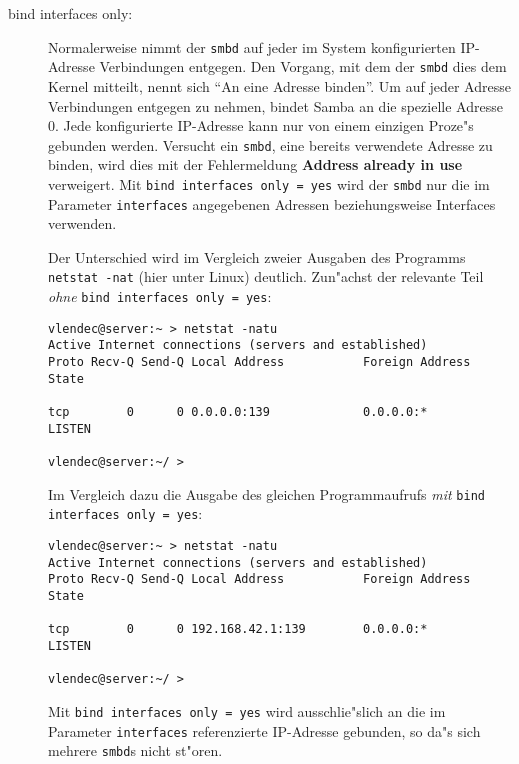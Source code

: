 \documentclass{scrartcl}\usepackage{pslatex}\typearea{12}
\newcommand{\prog}{\texttt}
\newcommand{\param}{\texttt}
\begin{document}
\begin{description}
\item[bind interfaces only:] Normalerweise nimmt der \prog{smbd} auf
  jeder im System konfigurierten IP-Adresse Verbindungen entgegen. Den
  Vorgang, mit dem der \prog{smbd} dies dem Kernel mitteilt, nennt
  sich "`An eine Adresse binden"'. Um auf jeder Adresse Verbindungen
  entgegen zu nehmen, bindet Samba an die spezielle Adresse 0. Jede
  konfigurierte IP-Adresse kann nur von einem einzigen Proze"s
  gebunden werden. Versucht ein \prog{smbd}, eine bereits verwendete
  Adresse zu binden, wird dies mit der Fehlermeldung \textbf{Address
    already in use} verweigert. Mit \prog{bind interfaces only = yes}
  wird der \prog{smbd} nur die im Parameter \prog{interfaces}
  angegebenen Adressen beziehungsweise Interfaces verwenden.
  
  Der Unterschied wird im Vergleich zweier Ausgaben des Programms
  \prog{netstat -nat} (hier unter Linux) deutlich. Zun"achst der
  relevante Teil \emph{ohne} \param{bind interfaces only = yes}:

\begin{verbatim}
vlendec@server:~ > netstat -natu
Active Internet connections (servers and established)
Proto Recv-Q Send-Q Local Address           Foreign Address         State    
 
tcp        0      0 0.0.0.0:139             0.0.0.0:*               LISTEN   
  
vlendec@server:~/ > 
\end{verbatim}
  
  Im Vergleich dazu die Ausgabe des gleichen Programmaufrufs
  \emph{mit} \param{bind interfaces only = yes}:

\begin{verbatim}
vlendec@server:~ > netstat -natu
Active Internet connections (servers and established)
Proto Recv-Q Send-Q Local Address           Foreign Address         State    
 
tcp        0      0 192.168.42.1:139        0.0.0.0:*               LISTEN   
  
vlendec@server:~/ > 
\end{verbatim}
  
  Mit \param{bind interfaces only = yes} wird ausschlie"slich an die
  im Parameter \param{interfaces} referenzierte IP-Adresse gebunden,
  so da"s sich mehrere \prog{smbd}s nicht st"oren.



\end{description}
\end{document}
